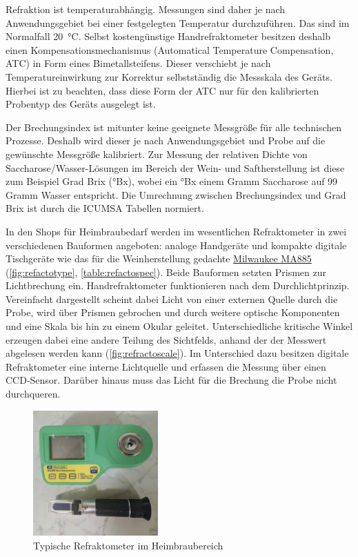 \documentclass[a4paper,parskip=half]{scrartcl}
\begin{document}
Refraktion ist temperaturabhängig. Messungen sind daher je nach
Anwendungsgebiet bei einer festgelegten Temperatur durchzuführen.
Das sind im Normalfall 20~°C. Selbst kostengünstige Handrefraktometer
besitzen deshalb einen Kompensationsmechanismus (Automatical Temperature
Compensation, ATC) in Form eines Bimetallsteifens. Dieser 
verschiebt je nach Temperatureinwirkung zur Korrektur selbstständig
die Messskala des Geräts. Hierbei ist zu beachten, dass diese Form der
ATC nur für den kalibrierten Probentyp des Geräts ausgelegt ist.
\autocite{Depalma2017,Distillique2020,Gossett2012,Terrill2013}

Der Brechungsindex ist mitunter keine geeignete Messgröße für alle
technischen Prozesse. Deshalb wird dieser je nach Anwendungsgebiet
und Probe auf die gewünschte Messgröße kalibriert. Zur Messung
der relativen Dichte von Saccharose/Wasser-Lösungen im Bereich der
Wein- und Saftherstellung ist diese zum Beispiel Grad Brix (°Bx), wobei
ein °Bx einem Gramm Saccharose auf 99 Gramm Wasser entspricht. Die
Umrechnung zwischen Brechungsindex und Grad Brix ist durch die ICUMSA
Tabellen normiert.
\autocite{Bonham2001,Terrill2013}

In den Shops für Heimbraubedarf werden im wesentlichen Refraktometer in
zwei verschiedenen Bauformen angeboten: analoge Handgeräte
und kompakte digitale Tischgeräte wie das für die Weinherstellung
gedachte \href{https://milwaukeeinstruments.eu/milwaukee-ma885-digital-brix-oechsle-oe-and-kmw-babo-refractometer/}{Milwaukee MA885} (\autoref{fig:refactotype},
\autoref{table:refactospec}). Beide Bauformen setzten Prismen zur
Lichtbrechung ein. Handrefraktometer funktionieren
nach dem Durchlichtprinzip. Vereinfacht dargestellt scheint dabei Licht
von einer externen Quelle durch die Probe, wird über Prismen gebrochen
und durch weitere optische Komponenten und eine Skala bis hin zu einem
Okular geleitet. Unterschiedliche kritische Winkel erzeugen dabei eine
andere Teilung des Sichtfelds, anhand der der Messwert abgelesen werden
kann (\autoref{fig:refractoscale}). Im Unterschied dazu besitzen
digitale Refraktometer eine interne Lichtquelle und erfassen die
Messung über einen CCD-Sensor. Darüber hinaus muss das Licht für
die Brechung die Probe nicht durchqueren. \autocite{AKRSSOGH2021,Gamer1959,Terrill2013}
 
\begin{figure}[h]
\centering
\includegraphics[width=4.8cm]{images/types.jpg}
\caption{Typische Refraktometer im Heimbraubereich}
\label{fig:refactotype}
\end{figure}
\end{document}
